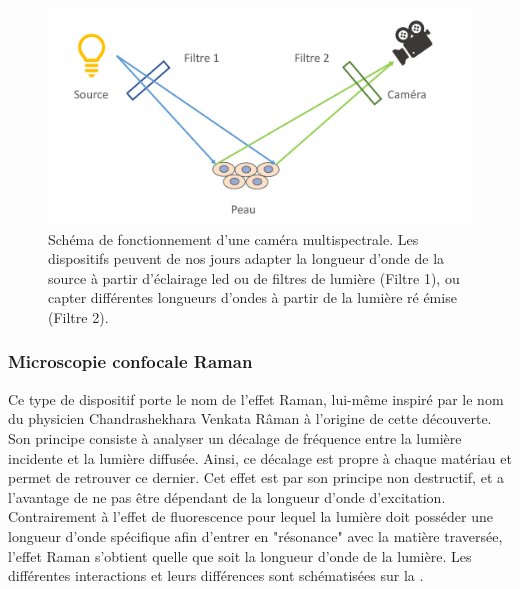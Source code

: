 \begin{figure}[H]
    \centering
    \includegraphics[width=\linewidth]{contents/chapter_2/resources/scheme_multispectral_principle.pdf}
    \caption{Schéma de fonctionnement d'une caméra multispectrale. Les dispositifs peuvent de nos jours adapter la longueur d'onde de la source à partir d'éclairage \gls{led} ou de filtres de lumière (Filtre 1), ou capter différentes longueurs d'ondes à partir de la lumière ré émise (Filtre 2).}
    \label{fig:scheme_multispectral_principle}
\end{figure}\par

\subsubsection{Microscopie confocale Raman}
Ce type de dispositif porte le nom de l'effet Raman, lui-même inspiré par le nom du physicien Chandrashekhara Venkata Râman à l'origine de cette découverte. Son principe consiste à analyser un décalage de fréquence entre la lumière incidente et la lumière diffusée. Ainsi, ce décalage est propre à chaque matériau et permet de retrouver ce dernier. Cet effet est par son principe non destructif, et a l'avantage de ne pas être dépendant de la longueur d'onde d'excitation. Contrairement à l'effet de fluorescence pour lequel la lumière doit posséder une longueur d'onde spécifique afin d'entrer en "résonance" avec la matière traversée, l'effet Raman s'obtient quelle que soit la longueur d'onde de la lumière. Les différentes interactions et leurs différences sont schématisées sur la .\par

